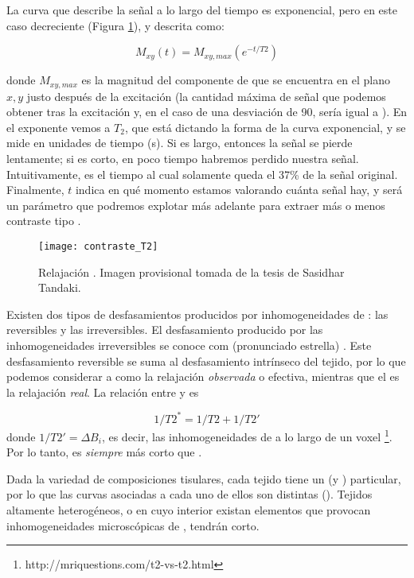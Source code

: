 La curva que describe la señal a lo largo del tiempo es exponencial, pero en este caso decreciente (Figura \ref{fig:T2}), y descrita como:

\begin{equation}
\label{eq:T2}
 M_{xy}(t) = M_{xy,max} (e^{-t/T2})
\end{equation}

donde $M_{xy,max}$ es la magnitud del componente de \M que se encuentra en el plano $x,y$ justo después de la excitación (la cantidad máxima de señal que podemos obtener tras la excitación y, en el caso de una desviación de 90\degrees, sería igual a \M). En el exponente vemos a $T_2$, que está dictando la forma de la curva exponencial, y se mide en unidades de tiempo (s). Si \Ttwo es largo, entonces la señal se pierde lentamente; si es corto, en poco tiempo habremos perdido nuestra señal. Intuitivamente, \Ttwo es el tiempo al cual solamente queda el 37\% de la señal \Mxy original. Finalmente, $t$ indica en qué momento estamos valorando cuánta señal hay, y será un parámetro que podremos explotar más adelante para extraer más o menos contraste tipo \Ttwo. 

\begin{figure}[htb]
\begin{figg}
   \texttt{[image: contraste\_T2]}
   \caption{Relajación \Ttwo. Imagen provisional tomada de la tesis de Sasidhar Tandaki. \citep{tadanki2018}}
 \label{fig:T2}
 \end{figg}
\end{figure}


Existen dos tipos de desfasamientos producidos por inhomogeneidades de \Bzero: las reversibles y las irreversibles. El desfasamiento producido por las inhomogeneidades irreversibles se conoce com \Ttwostar (pronunciado \Ttwo estrella) . Este desfasamiento reversible se suma al desfasamiento intrínseco del tejido, por lo que podemos considerar a \Ttwostar como la relajación \textit{observada} o efectiva, mientras que el \Ttwo es la relajación \textit{real}. La relación entre \Ttwo y \Ttwostar es

\begin{equation}
 1/T2^* = 1/T2 + 1/T2'
\end{equation}
donde $1/T2'= \Delta B_i$, es decir, las inhomogeneidades de \Bzero a lo largo de un voxel \footnote{http://mriquestions.com/t2-vs-t2.html}. Por lo tanto, \Ttwostar es \textit{siempre} más corto que \Ttwo.


Dada la variedad de composiciones tisulares, cada tejido tiene un \Ttwo (y \Ttwostar) particular, por lo que las curvas asociadas a cada uno de ellos son distintas (\figurapendiente). Tejidos altamente heterogéneos, o en cuyo interior existan elementos que provocan inhomogeneidades microscópicas de \Bzero, tendrán \Ttwo corto.


